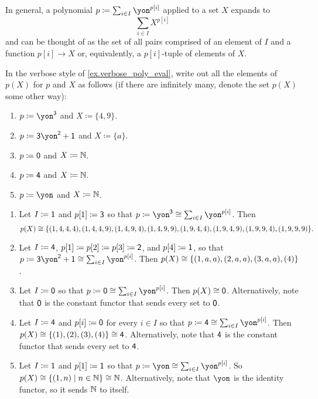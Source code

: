 \documentclass[Book-Poly]{subfiles}
\begin{document}
In general, a polynomial $p\coloneqq\sum_{i\in I}\yon^{p[i]}$ applied to a set $X$ expands to
\[
\sum_{i\in I}X^{p[i]}
\]
and can be thought of as the set of all pairs comprised of an element of $I$ and a function $p[i]\to X$ or, equivalently, a $p[i]$-tuple of elements of $X$.

\begin{exercise}
    In the verbose style of \cref{ex.verbose_poly_eval}, write out all the elements of $p(X)$ for $p$ and $X$ as follows (if there are infinitely many, denote the set $p(X)$ some other way):
    \begin{enumerate}
        \item $p\coloneqq\yon^\3$ and $X\coloneqq\{4,9\}.$
        \item $p\coloneqq\3\yon^\2+\1$ and $X\coloneqq\{a\}$.
        \item $p\coloneqq\textsf{0}$ and $X\coloneqq\mathbb{N}$.
        \item $p\coloneqq\textsf{4}$ and $X\coloneqq\mathbb{N}$.
        \item $p\coloneqq\yon$ and $X\coloneqq\mathbb{N}$.
        \qedhere
    \end{enumerate}
    \begin{solution}
        \begin{enumerate}
            \item Let $I\coloneqq\textsf{1}$ and $p[1]\coloneqq\textsf{3}$ so that $p\coloneqq\yon^\3\iso\sum_{i\in I}\yon^{p[i]}$.
            Then
            \[
            p(X)\cong\{(1, 4, 4, 4), (1, 4, 4, 9), (1, 4, 9, 4), (1, 4, 9, 9), (1, 9, 4, 4), (1, 9, 4, 9), (1, 9, 9, 4), (1, 9, 9, 9)\}.
            \]

            \item Let $I\coloneqq\textsf{4}$, $p[1]\coloneqq p[2]\coloneqq p[3]\coloneqq\textsf{2}$, and $p[4]\coloneqq\textsf{1}$, so that $p\coloneqq\3\yon^\2+\1\iso\sum_{i\in I}\yon^{p[i]}$.
            Then $p(X)\cong\{(1,a,a),(2,a,a),(3,a,a),(4)\}$.

            \item Let $I\coloneqq\textsf{0}$ so that $p\coloneqq\0\iso\sum_{i\in I}\yon^{p[i]}$.
            Then $p(X)\cong\textsf{0}$.
            Alternatively, note that $\textsf{0}$ is the constant functor that sends every set to $\textsf{0}$.

            \item Let $I\coloneqq\textsf{4}$ and $p[i]\coloneqq\textsf{0}$ for every $i\in I$ so that $p\coloneqq\4\iso\sum_{i\in I}\yon^{p[i]}$.
            Then $p(X)\cong\{(1), (2), (3), (4)\}\cong\textsf{4}$.
            Alternatively, note that $\textsf{4}$ is the constant functor that sends every set to $\textsf{4}$.

            \item Let $I \coloneqq \textsf{1}$ and $p[1] \coloneqq \textsf{1}$ so that $p\coloneqq\yon\iso\sum_{i\in I}\yon^{p[i]}$.
            So $p(X)\cong\{(1,n)\mid n\in\mathbb{N}\}\cong\mathbb{N}$.
            Alternatively, note that $\yon$ is the identity functor, so it sends $\mathbb{N}$ to itself.
        \end{enumerate}
    \end{solution}
\end{exercise}
\end{document}
